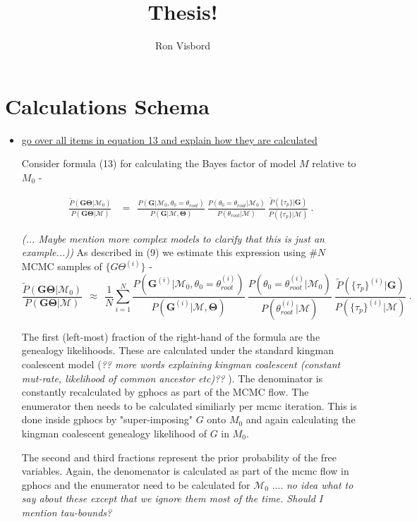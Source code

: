 \documentclass[11pt]{article}
\author{Ron Visbord}
\title{Thesis!}
\newcommand{\vect}[1]{\boldsymbol{\mathbf{#1}}}
\newcommand{\M}{\mathcal{M}}
\newcommand{\G}{\vect{G}}
\newcommand{\T}{\vect{\Theta}}
\newcommand{\GT}{\G\T}
\newcommand{\Pref}{\widetilde{P}}
\newcommand{\troot}{\theta_{root}}
\begin{document}
\maketitle


\section{Calculations Schema}

\begin{itemize}


\item \underline{go over all items in equation 13 and explain how they are calculated}

Consider formula (13) for calculating the Bayes factor of model $M$ relative to $M_0$ - 
%
\begin{small}
\begin{align}
\frac{\Pref(\GT|\M_0) }{P(\GT|\M)}
&=~~ \frac{ P(\G|\M_0,\theta_0=\troot) }{ P(\G|\M,\T)}~ 
     \frac{ P(\theta_0=\troot|\M_0)}{P(\troot|\M)}\
     \frac{ \Pref(\{\tau_p\}|\G)}{P(\{\tau_p\}|\M)} ~. \label{eq:rbf_null}
\end{align}
\end{small}
%
\textit{(... Maybe mention more complex models to clarify that this is just an example...))}  As described in (9) we estimate this expression using $\#N$ MCMC samples of $\{G\Theta^{(i)}\}$ - 
%
\begin{equation}\label{eq:rbf}
 \frac{\Pref(\GT|\M_0) }{P(\GT|\M)}
  ~~\approx~~ \frac{1}{N} \sum_{i=1}^{N}\frac{ P(\G^{(i)}|\M_0,\theta_0=\troot^{(i)}) }{ P(\G^{(i)}|\M,\T)}~ 
     \frac{ P(\theta_0=\troot^{(i)}|\M_0)}{P(\troot^{(i)}|\M)}\
     \frac{ \Pref(\{\tau_p\}^{(i)}|\G)}{P(\{\tau_p\}^{(i)}|\M)} ~.
\end{equation}
%
% 
 
The first (left-most) fraction of the right-hand of the formula are the genealogy likelihoods. These are calculated under the standard kingman coalescent model (\textit{?? more words explaining kingman coalescent (constant mut-rate, likelihood of common ancestor etc)?? }). The denominator is constantly recalculated by gphocs as part of the MCMC flow. The enumerator then needs to be calculated similiarly per mcmc iteration. This is done inside gphocs by "super-imposing" $G$ onto $M_0$ and again calculating the kingman coalescent genealogy likelihood of $G$ in $M_0$.

The second and third fractions represent the prior probability of the free variables. Again, the denomenator is calculated as part of the mcmc flow in gphocs and the enumerator need to be calculated for $\M_0$  .... \textit{no idea what to say about these except that we ignore them most of the time. Should I mention tau-bounds?}
 



\end{itemize}
\end{document}
